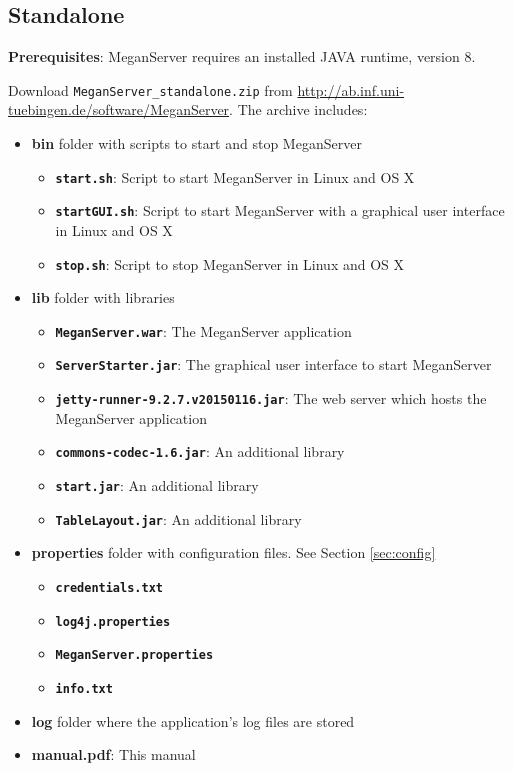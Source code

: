 \documentclass[11pt]{article}
\begin{document}
\subsection{Standalone}
\textbf{Prerequisites}: MeganServer requires an installed JAVA runtime, version 8.

Download \texttt{MeganServer\_standalone.zip} from \url{http://ab.inf.uni-tuebingen.de/software/MeganServer}. The archive includes:

\begin{itemize}

\item \textbf{bin} folder with scripts to start and stop MeganServer
	\begin{itemize}
		\item \textbf{\texttt{start.sh}}: Script to start MeganServer in Linux and OS X
		\item \textbf{\texttt{startGUI.sh}}: Script to start MeganServer with a graphical user interface in Linux and OS X
		\item \textbf{\texttt{stop.sh}}: Script to stop MeganServer in Linux and OS X
	\end{itemize}
\item \textbf{lib} folder with libraries
	\begin{itemize}
		\item \textbf{\texttt{MeganServer.war}}: The MeganServer application
		\item \textbf{\texttt{ServerStarter.jar}}: The graphical user interface to start MeganServer
		\item \textbf{\texttt{jetty-runner-9.2.7.v20150116.jar}}: The web server which hosts the MeganServer application
		\item \textbf{\texttt{commons-codec-1.6.jar}}: An additional library
		\item \textbf{\texttt{start.jar}}: An additional library
		\item \textbf{\texttt{TableLayout.jar}}: An additional library
	\end{itemize}
\item \textbf{properties} folder with configuration files. See Section \ref{sec:config}
	\begin{itemize}
	\item \textbf{\texttt{credentials.txt}}
	\item \textbf{\texttt{log4j.properties}}
	\item \textbf{\texttt{MeganServer.properties}}
	\item \textbf{\texttt{info.txt}}
	\end{itemize}
\item \textbf{log} folder where the application's log files are stored
\item \textbf{manual.pdf}: This manual
\end{itemize}
\end{document}
